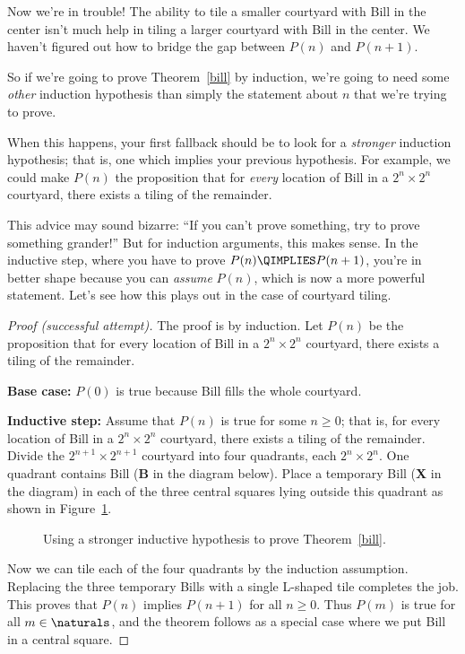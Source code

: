 Now we're in trouble!  The ability to tile a smaller courtyard with Bill
in the center isn't much help in tiling a larger courtyard with Bill in
the center.  We haven't figured out how to bridge the gap between $P(n)$
and $P(n+1)$.

So if we're going to prove Theorem~\ref{bill} by induction, we're going to
need some \emph{other} induction hypothesis than simply the statement
about $n$ that we're trying to prove.





When this happens, your first fallback should be to look for a
\emph{stronger} induction hypothesis; that is, one which implies
your previous hypothesis.  For example, we could make $P(n)$ the
proposition that for \emph{every} location of Bill in a $2^n \times
2^n$ courtyard, there exists a tiling of the remainder.

This advice may sound bizarre: ``If you can't prove something, try to
prove something grander!''  But for induction arguments, this makes
sense.  In the inductive step, where you have to prove $P(n) \QIMPLIES
P(n+1)$, you're in better shape because you can \emph{assume} $P(n)$,
which is now a more powerful statement.  Let's see how this plays out
in the case of courtyard tiling.

\begin{proof}[Proof (successful attempt)]
The proof is by induction.  Let $P(n)$ be the proposition that for
every location of Bill in a $2^n \times 2^n$ courtyard, there exists a
tiling of the remainder.

\textbf{Base case:} $P(0)$ is true because Bill fills the
whole courtyard.

\textbf{Inductive step:} Assume that $P(n)$ is true for some
$n \geq 0$; that is, for every location of Bill in a $2^n \times 2^n$
courtyard, there exists a tiling of the remainder.  Divide the
$2^{n+1} \times 2^{n+1}$ courtyard into four quadrants, each $2^n
\times 2^n$.  One quadrant contains Bill (\textbf{B} in the diagram
below).  Place a temporary Bill (\textbf{X} in the diagram) in each of
the three central squares lying outside this quadrant as shown in
Figure~\ref{fig:bill-strong-induction}.

\begin{figure}


\caption{Using a stronger inductive hypothesis to prove
  Theorem~\ref{bill}.}
\label{fig:bill-strong-induction}
\end{figure}

Now we can tile each of the four quadrants by the induction
assumption.  Replacing the three temporary Bills with a single
L-shaped tile completes the job.  This proves that $P(n)$ implies
$P(n+1)$ for all $n \geq 0$.  Thus $P(m)$ is true for all $m \in
\naturals$, and the theorem follows as a special case where we put
Bill in a central square.
\end{proof}

